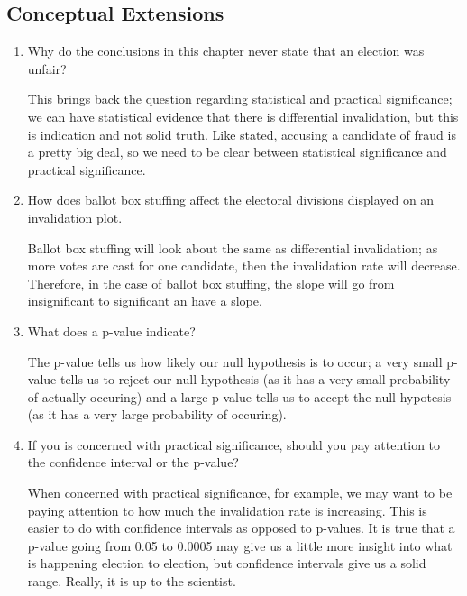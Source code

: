 \subsection*{Conceptual Extensions}
\begin{enumerate}

 \item Why do the conclusions in this chapter never state that an election was unfair?
\begin{solution}
This brings back the question regarding statistical and practical significance; we can have statistical evidence that there is differential invalidation, but this is indication and not solid truth. Like stated, accusing a candidate of fraud is a pretty big deal, so we need to be clear between statistical significance and practical significance. 
\end{solution}
 
 \item How does ballot box stuffing affect the electoral divisions displayed on an invalidation plot.
\begin{solution}
Ballot box stuffing will look about the same as differential invalidation; as more votes are cast for one candidate, then the invalidation rate will decrease. Therefore, in the case of ballot box stuffing, the slope will go from insignificant to significant an have a slope. 
\end{solution}
 
 \item What does a p-value indicate?
\begin{solution}
The p-value tells us how likely our null hypothesis is to occur; a very small p-value tells us to reject our null hypothesis (as it has a very small probability of actually occuring) and a large p-value tells us to accept the null hypotesis (as it has a very large probability of occuring). 
\end{solution}
 
 \item If you is concerned with practical significance, should you pay attention to the confidence interval or the p-value?
\begin{solution}
When concerned with practical significance, for example, we may want to be paying attention to how much the invalidation rate is increasing. This is easier to do with confidence intervals as opposed to p-values. It is true that a p-value going from 0.05 to 0.0005 may give us a little more insight into what is happening election to election, but confidence intervals give us a solid range. Really, it is up to the scientist. 
\end{solution}
 
\end{enumerate}




